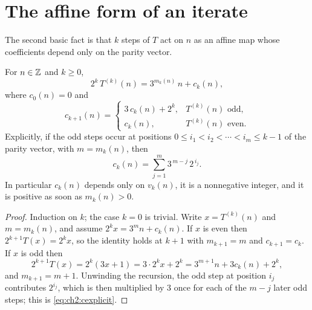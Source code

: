 \section{The affine form of an iterate}\label{sec:ch2:affine}

The second basic fact is that $k$ steps of $T$ act on $n$ as an affine map
whose coefficients depend only on the parity vector.

\begin{proposition}\label{prop:ch2:affine}
For $n\in\mathbb{Z}$ and $k\geq0$,
\begin{equation}\label{eq:ch2:affine}
  2^k\,T^{(k)}(n)=3^{m_k(n)}\,n+c_k(n),
\end{equation}
where $c_0(n)=0$ and
\begin{equation}\label{eq:ch2:crec}
  c_{k+1}(n)=\begin{cases}3\,c_k(n)+2^k, & T^{(k)}(n)\text{ odd},\\
  c_k(n), & T^{(k)}(n)\text{ even}.\end{cases}
\end{equation}
Explicitly, if the odd steps occur at positions $0\leq i_1<i_2<\cdots<i_m\leq
k-1$ of the parity vector, with $m=m_k(n)$, then
\begin{equation}\label{eq:ch2:cexplicit}
  c_k(n)=\sum_{j=1}^{m}3^{\,m-j}\,2^{\,i_j}.
\end{equation}
In particular $c_k(n)$ depends only on $v_k(n)$, it is a nonnegative integer,
and it is positive as soon as $m_k(n)>0$.
\end{proposition}

\begin{proof}
Induction on $k$; the case $k=0$ is trivial. Write $x=T^{(k)}(n)$ and
$m=m_k(n)$, and assume $2^kx=3^mn+c_k(n)$. If $x$ is even then
$2^{k+1}T(x)=2^kx$, so the identity holds at $k+1$ with $m_{k+1}=m$ and
$c_{k+1}=c_k$. If $x$ is odd then
\[
  2^{k+1}T(x)=2^k(3x+1)=3\cdot2^kx+2^k=3^{m+1}n+3c_k(n)+2^k,
\]
and $m_{k+1}=m+1$. Unwinding the recursion, the odd step at position $i_j$
contributes $2^{i_j}$, which is then multiplied by $3$ once for each of the
$m-j$ later odd steps; this is \eqref{eq:ch2:cexplicit}.
\end{proof}

